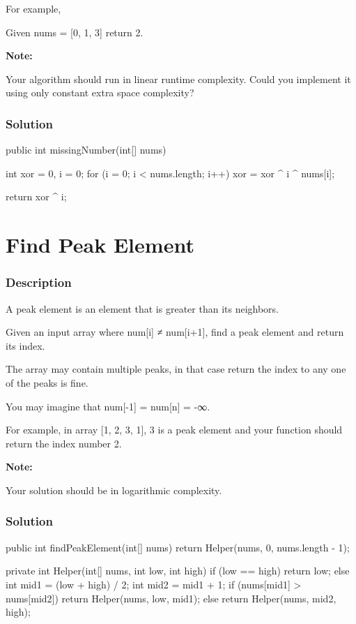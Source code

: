 For example,

Given nums = [0, 1, 3] return 2.

\textbf{Note:}

Your algorithm should run in linear runtime complexity. Could you implement it using only constant extra space complexity?
\subsubsection{Solution}

\begin{Code}
public int missingNumber(int[] nums) {
    int xor = 0, i = 0;
    for (i = 0; i < nums.length; i++) {
        xor = xor ^ i ^ nums[i];
    }

    return xor ^ i;
}
\end{Code}

\newpage

\section{Find Peak Element} %

\subsubsection{Description}
A peak element is an element that is greater than its neighbors.

Given an input array where num[i] ≠ num[i+1], find a peak element and return its index.

The array may contain multiple peaks, in that case return the index to any one of the peaks is fine.

You may imagine that num[-1] = num[n] = -∞.

For example, in array [1, 2, 3, 1], 3 is a peak element and your function should return the index number 2.

\textbf{Note:}

Your solution should be in logarithmic complexity.
\subsubsection{Solution}

\begin{Code}
public int findPeakElement(int[] nums) {
    return Helper(nums, 0, nums.length - 1);
}

private int Helper(int[] nums, int low, int high) {
    if (low == high) {
        return low;
    } else {
        int mid1 = (low + high) / 2;
        int mid2 = mid1 + 1;
        if (nums[mid1] > nums[mid2]) {
            return Helper(nums, low, mid1);
        } else {
            return Helper(nums, mid2, high);
        }
    }
}
\end{Code}

